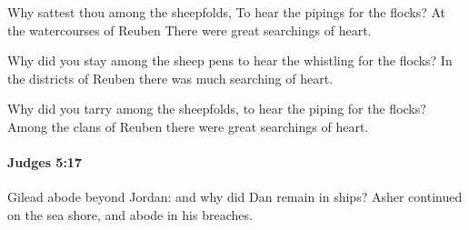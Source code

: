 			\begin{versebox}
					\item[BHS] 
					\item[ASV] Why sattest thou among the sheepfolds, To hear the pipings for the flocks? At the watercourses of Reuben There were great searchings of heart.
					\item[NIV] Why did you stay among the sheep pens to hear the whistling for the flocks? In the districts of Reuben there was much searching of heart.
					\item[NRSV] Why did you tarry among the sheepfolds, to hear the piping for the flocks? Among the clans of Reuben there were great searchings of heart.
			\end{versebox}

		\paragraph{Judges 5:17} %
			\label{JUDGES-5-17}

			Gilead abode beyond Jordan: and why did Dan remain in ships? Asher continued on the sea shore, and abode in his breaches.

